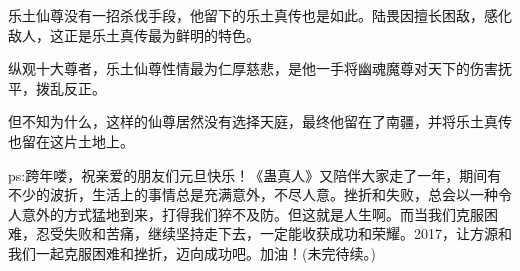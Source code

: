 \begin{this_body}
乐土仙尊没有一招杀伐手段，他留下的乐土真传也是如此。陆畏因擅长困敌，感化敌人，这正是乐土真传最为鲜明的特色。

纵观十大尊者，乐土仙尊性情最为仁厚慈悲，是他一手将幽魂魔尊对天下的伤害抚平，拨乱反正。

但不知为什么，这样的仙尊居然没有选择天庭，最终他留在了南疆，并将乐土真传也留在这片土地上。

ps:跨年喽，祝亲爱的朋友们元旦快乐！《蛊真人》又陪伴大家走了一年，期间有不少的波折，生活上的事情总是充满意外，不尽人意。挫折和失败，总会以一种令人意外的方式猛地到来，打得我们猝不及防。但这就是人生啊。而当我们克服困难，忍受失败和苦痛，继续坚持走下去，一定能收获成功和荣耀。2017，让方源和我们一起克服困难和挫折，迈向成功吧。加油！(未完待续。)

\end{this_body}

